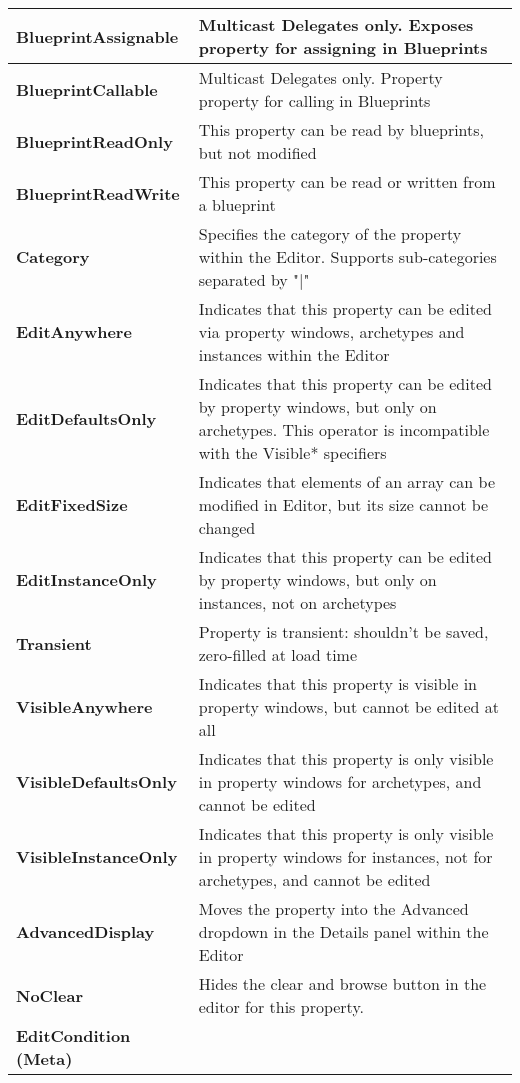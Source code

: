 \documentclass[10pt]{article}
\begin{document}
\begin{multicols*}{5}
\begin{tabularx}{\columnwidth}{|p{3.5cm}|X|}
		\hline \textbf{BlueprintAssignable}
		&  Multicast Delegates only. Exposes property for assigning in Blueprints  \\
		\hline \textbf{BlueprintCallable}
		&   Multicast Delegates only. Property property for calling in Blueprints \\
		\hline \textbf{BlueprintReadOnly}
		& This property can be read by blueprints, but not modified \\ 
		\hline \textbf{BlueprintReadWrite}
		&  This property can be read or written from a blueprint \\
		\hline \textbf{Category} 
		& Specifies the category of the property within the Editor. Supports sub-categories separated by "$\vert$" \\ 
		\hline \textbf{EditAnywhere}
		&  Indicates that this property can be edited via property windows, archetypes and instances within the Editor \\ 
		\hline \textbf{EditDefaultsOnly}
		& Indicates that this property can be edited by property windows, but only on archetypes. This operator is incompatible with the Visible* specifiers \\ 
		\hline \textbf{EditFixedSize}
		& Indicates that elements of an array can be modified in Editor, but its size cannot be changed \\ 
		\hline \textbf{EditInstanceOnly}
		&  Indicates that this property can be edited by property windows, but only on instances, not on archetypes \\ 
		\hline \textbf{Transient}
		& Property is transient: shouldn't be saved, zero-filled at load time \\ 
		\hline \textbf{VisibleAnywhere}
		& Indicates that this property is visible in property windows, but cannot be edited at all \\ 
		\hline \textbf{VisibleDefaultsOnly}
		& Indicates that this property is only visible in property windows for archetypes, and cannot be edited \\ 
		\hline \textbf{VisibleInstanceOnly}
		& Indicates that this property is only visible in property windows for instances, not for archetypes, and cannot be edited \\ 
		\hline \textbf{AdvancedDisplay}
		& Moves the property into the Advanced dropdown in the Details panel within the Editor \\
		\hline \textbf{NoClear}
		& Hides the clear and browse button in the editor for this property. \\
		\hline \textbf{EditCondition (Meta)}

\end{tabularx}
\end{multicols*}
\end{document}
